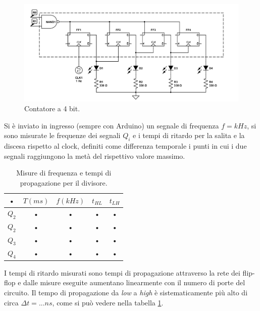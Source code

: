 \documentclass[10pt,a4paper]{article}
\begin{document}
\begin{figure}
\centering
\includegraphics[scale=0.5]{divisore.png}
\caption{Contatore a 4 bit.\label{contatore}}
\end{figure}

Si è inviato in ingresso (sempre con Arduino) un segnale di frequenza $f = kHz$, si sono misurate le frequenze dei segnali $Q_i$ e i tempi di ritardo per la salita e la discesa rispetto al clock, definiti come differenza temporale i punti in cui i due segnali raggiungono la metà del rispettivo valore massimo.\\

\begin{table}[!htb]
\centering
\begin{tabular}{|c|c|c|c|c|}
\hline 
• & $T (ms)$ & $f (kHz)$ & $t_{HL}$ & $t_{LH}$ \\ 
\hline 
$Q_2$ & • & • & • & • \\ 
\hline 
$Q_2$ & • & • & • & • \\ 
\hline 
$Q_3$ & • & • & • & • \\ 
\hline 
$Q_4$ & • & • & • & • \\ 
\hline 
\end{tabular} 
\caption{Misure di frequenza e tempi di propagazione per il divisore. \label{misureDivisore}}
\end{table}

I tempi di ritardo misurati sono tempi di propagazione attraverso la rete dei flip-flop e dalle misure eseguite aumentano linearmente con il numero di porte del circuito. Il tempo di propagazione da \emph{low} a \emph{high} è sistematicamente più alto di circa $\Delta t = ... ns$, come si può vedere nella tabella \ref{misureDivisore}.\\ 

\end{document}
